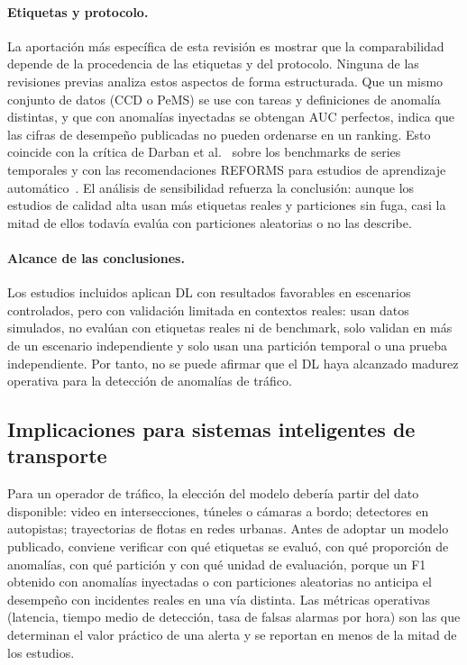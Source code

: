 \documentclass[12pt, a4paper]{article}
\begin{document}
\paragraph{Etiquetas y protocolo.} La aportación más específica de esta revisión es mostrar que la comparabilidad depende de la procedencia de las etiquetas y del protocolo. Ninguna de las revisiones previas analiza estos aspectos de forma estructurada. Que un mismo conjunto de datos (CCD o PeMS) se use con tareas y definiciones de anomalía distintas, y que con anomalías inyectadas se obtengan AUC perfectos, indica que las cifras de desempeño publicadas no pueden ordenarse en un ranking. Esto coincide con la crítica de Darban et al.~\cite{darban2024deep} sobre los benchmarks de series temporales y con las recomendaciones REFORMS para estudios de aprendizaje automático~\cite{kapoor2024reforms}. El análisis de sensibilidad refuerza la conclusión: aunque los estudios de calidad alta usan más etiquetas reales y particiones sin fuga, casi la mitad de ellos todavía evalúa con particiones aleatorias o no las describe.

\paragraph{Alcance de las conclusiones.} Los estudios incluidos aplican DL con resultados favorables en escenarios controlados, pero con validación limitada en contextos reales: \NdatosSimuladosAny{} usan datos simulados, \NetiqNoReales{} no evalúan con etiquetas reales ni de benchmark, solo \QASeissi{} validan en más de un escenario independiente y solo \STodosPartOK{} usan una partición temporal o una prueba independiente. Por tanto, no se puede afirmar que el DL haya alcanzado madurez operativa para la detección de anomalías de tráfico.

\subsection{Implicaciones para sistemas inteligentes de transporte}

Para un operador de tráfico, la elección del modelo debería partir del dato disponible: video en intersecciones, túneles o cámaras a bordo; detectores en autopistas; trayectorias de flotas en redes urbanas. Antes de adoptar un modelo publicado, conviene verificar con qué etiquetas se evaluó, con qué proporción de anomalías, con qué partición y con qué unidad de evaluación, porque un F1 obtenido con anomalías inyectadas o con particiones aleatorias no anticipa el desempeño con incidentes reales en una vía distinta. Las métricas operativas (latencia, tiempo medio de detección, tasa de falsas alarmas por hora) son las que determinan el valor práctico de una alerta y se reportan en menos de la mitad de los estudios.
\end{document}
